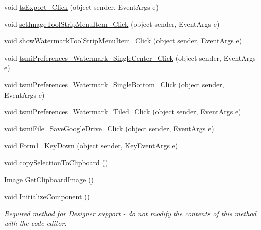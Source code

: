 \begin{DoxyCompactItemize}
\item 
void \mbox{\hyperlink{class_paint___program_1_1_form1_a4873c3ace311fbbb55b5ec69fb9bcabb}{ts\+Export\+\_\+\+Click}} (object sender, Event\+Args e)
\item 
void \mbox{\hyperlink{class_paint___program_1_1_form1_ae65589572c49c53a057ab082655fdc9f}{set\+Image\+Tool\+Strip\+Menu\+Item\+\_\+\+Click}} (object sender, Event\+Args e)
\item 
void \mbox{\hyperlink{class_paint___program_1_1_form1_a7ade3db8b670a8074a6c722a4fb9429a}{show\+Watermark\+Tool\+Strip\+Menu\+Item\+\_\+\+Click}} (object sender, Event\+Args e)
\item 
void \mbox{\hyperlink{class_paint___program_1_1_form1_a0c71da900bd2280ad32b40bead78f533}{tsmi\+Preferences\+\_\+\+Watermark\+\_\+\+Single\+Center\+\_\+\+Click}} (object sender, Event\+Args e)
\item 
void \mbox{\hyperlink{class_paint___program_1_1_form1_a2839796ff524d74574e6dc0de35a1f2e}{tsmi\+Preferences\+\_\+\+Watermark\+\_\+\+Single\+Bottom\+\_\+\+Click}} (object sender, Event\+Args e)
\item 
void \mbox{\hyperlink{class_paint___program_1_1_form1_a7ad0af62b4e7f7a1107dd651831fdce5}{tsmi\+Preferences\+\_\+\+Watermark\+\_\+\+Tiled\+\_\+\+Click}} (object sender, Event\+Args e)
\item 
void \mbox{\hyperlink{class_paint___program_1_1_form1_a5261cf8944048cd6928089307274831e}{tsmi\+File\+\_\+\+Save\+Google\+Drive\+\_\+\+Click}} (object sender, Event\+Args e)
\item 
void \mbox{\hyperlink{class_paint___program_1_1_form1_aad3ab339698773a2374c8d7010435ed9}{Form1\+\_\+\+Key\+Down}} (object sender, Key\+Event\+Args e)
\item 
void \mbox{\hyperlink{class_paint___program_1_1_form1_ad86e85035811ec6e576968a86681a38f}{copy\+Selection\+To\+Clipboard}} ()
\item 
Image \mbox{\hyperlink{class_paint___program_1_1_form1_a46dce5128798bdc15d8fade229630ec0}{Get\+Clipboard\+Image}} ()
\item 
void \mbox{\hyperlink{class_paint___program_1_1_form1_a0c2c0648cdef32547fed28e522cf0cbe}{Initialize\+Component}} ()
\begin{DoxyCompactList}\small\item\em Required method for Designer support -\/ do not modify the contents of this method with the code editor. \end{DoxyCompactList}\end{DoxyCompactItemize}
